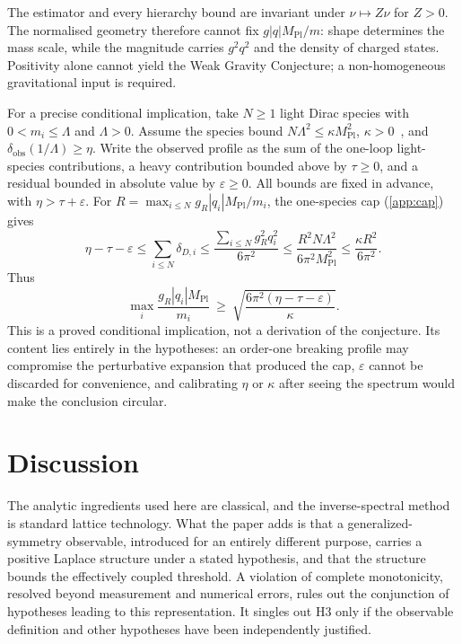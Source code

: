 \documentclass[11pt]{article}
\theoremstyle{definition}
\theoremstyle{remark}
\newcommand{\Mpl}{M_{\mathrm{Pl}}}
\begin{document}
The estimator and every hierarchy bound are invariant under
$\nu\mapsto Z\nu$ for $Z>0$. The normalised geometry therefore cannot fix
$g|q|\Mpl/m$: shape determines the mass scale, while the magnitude carries
$g^{2}q^{2}$ and the density of charged states. Positivity alone cannot yield
the Weak Gravity Conjecture; a non-homogeneous gravitational input is required.

For a precise conditional implication, take $N\ge1$ light Dirac species with
$0<m_i\le\Lambda$ and $\Lambda>0$. Assume the species bound
$N\Lambda^{2}\le\kappa\Mpl^{2}$, $\kappa>0$~\cite{dvali_species_2007},
and $\delta_{\mathrm{obs}}(1/\Lambda)\ge\eta$. Write the observed profile as
the sum of the one-loop light-species contributions, a heavy contribution
bounded above by $\tau\ge0$, and a residual bounded in absolute value by
$\varepsilon\ge0$. All bounds are fixed in advance, with
$\eta>\tau+\varepsilon$. For
$R=\max_{i\le N}g_R|q_i|\Mpl/m_i$, the one-species cap
(\cref{app:cap}) gives
\begin{equation}
\eta-\tau-\varepsilon
\le\sum_{i\le N}\delta_{D,i}
\le\frac{\sum_{i\le N}g_R^2q_i^2}{6\pi^2}
\le\frac{R^2 N\Lambda^2}{6\pi^2\Mpl^2}
\le\frac{\kappa R^2}{6\pi^2}.
\end{equation}
Thus
\begin{equation}
\max_{i}\frac{g_{R}|q_{i}|\Mpl}{m_{i}}
\ \ge\ \sqrt{\frac{6\pi^{2}(\eta-\tau-\varepsilon)}{\kappa}}.
\end{equation}
This is a proved conditional implication, not a derivation of the conjecture.
Its content lies entirely in the hypotheses: an order-one breaking profile may
compromise the perturbative expansion that produced the cap, $\varepsilon$
cannot be discarded for convenience, and calibrating $\eta$ or $\kappa$ after
seeing the spectrum would make the conclusion circular.

\section{Discussion}

The analytic ingredients used here are classical, and the inverse-spectral
method is standard lattice technology. What the paper adds is that a
generalized-symmetry observable, introduced for an entirely different purpose,
carries a positive Laplace structure under a stated hypothesis, and that the
structure bounds the effectively coupled threshold. A violation of complete
monotonicity, resolved beyond measurement and numerical errors, rules out
the conjunction of hypotheses leading to this representation. It singles out
H3 only if the observable definition and other hypotheses have been
independently justified.
\end{document}
